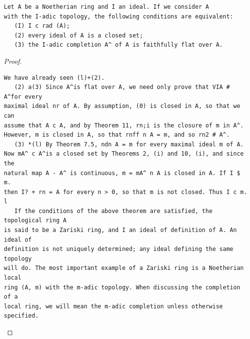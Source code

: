 \begin{theorem}\label{mcrt-auto-theorem-8-14}\uses{}
\begin{verbatim}
Let A be a Noetherian ring and I an ideal. If we consider A
with the I-adic topology, the following conditions are equivalent:
   (I) I c rad (A);
   (2) every ideal of A is a closed set;
   (3) the I-adic completion A^ of A is faithfully flat over A.
\end{verbatim}
\end{theorem}
\begin{proof}
\begin{verbatim}
We have already seen (l)+(2).
   (2) a(3) Since A^is flat over A, we need only prove that VIA # A^for every
maximal ideal nr of A. By assumption, (0) is closed in A, so that we can
assume that A c A, and by Theorem 11, rn;i is the closure of m in A^.
However, m is closed in A, so that rnff n A = m, and so rn2 # A^.
   (3) *(l) By Theorem 7.5, ndn A = m for every maximal ideal m of A.
Now mA^ c A^is a closed set by Theorems 2, (i) and 10, (i), and since the
natural map A - A^ is continuous, m = mA^ n A is closed in A. If I $ m.
then I? + rn = A for every n > 0, so that m is not closed. Thus I c m. l
   If the conditions of the above theorem are satisfied, the topological ring A
is said to be a Zariski ring, and I an ideal of definition of A. An ideal of
definition is not uniquely determined; any ideal defining the same topology
will do. The most important example of a Zariski ring is a Noetherian local
ring (A, m) with the m-adic topology. When discussing the completion of a
local ring, we will mean the m-adic completion unless otherwise specified.
\end{verbatim}
\end{proof}


